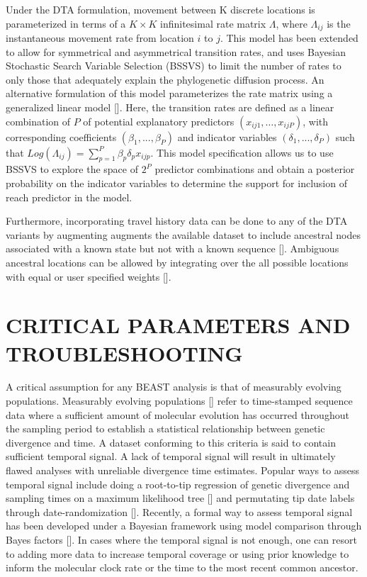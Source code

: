 \documentclass{article}
\begin{document}
\begin{multicols}{2}
Under the DTA formulation, movement between K discrete locations is parameterized in terms of a $K \times K$ infinitesimal rate matrix $\Lambda$, where $\Lambda_{ij}$ is the instantaneous movement rate from location $i$ to $j$. This model has been extended to allow for symmetrical and asymmetrical transition rates, and uses Bayesian Stochastic Search Variable Selection (BSSVS) to limit the number of rates to only those that adequately explain the phylogenetic diffusion process. An alternative formulation of this model parameterizes the rate matrix using a generalized linear model [\cite{glm}]. Here, the transition rates are defined as a linear combination of $P$ of potential explanatory predictors $(x_{ij1}, \dots, x_{ijP})$, with corresponding coefficients $(\beta_1, ..., \beta_P )$ and indicator variables $(\delta_1, ..., \delta_P )$ such that $Log(\Lambda_{ij}) = \sum_{p=1}^P \beta_p \delta_p x_{ijp}$. This model specification allows us to use BSSVS to explore the space of $2^P$ predictor combinations and obtain a posterior probability on the indicator variables to determine the support for inclusion of reach predictor in the model.

Furthermore, incorporating travel history data can be done to any of the DTA variants by augmenting augments the available dataset to include ancestral nodes associated with a known state but not with a known sequence [\cite{travhist}]. Ambiguous ancestral locations can be allowed by integrating over the all possible locations with equal or user specified weights [\cite{ambig}].

\section*{CRITICAL PARAMETERS AND TROUBLESHOOTING}
A critical assumption for any BEAST analysis is that of measurably evolving populations. Measurably evolving populations [\cite{mep1,mep2}] refer to time-stamped sequence data where a sufficient amount of molecular evolution has occurred throughout the sampling period to establish a statistical relationship between genetic divergence and time. A dataset conforming to this criteria is said to contain sufficient temporal signal. A lack of temporal signal will result in ultimately flawed analyses with unreliable divergence time estimates. Popular ways to assess temporal signal include doing a root-to-tip regression of genetic divergence and sampling times on a maximum likelihood tree [\cite{tempest}] and permutating tip date labels through date-randomization [\cite{tipdate}]. Recently, a formal way to assess temporal signal has been developed under a Bayesian framework using model comparison through Bayes factors [\cite{bets}]. In cases where the temporal signal is not enough, one can resort to adding more data to increase temporal coverage or using prior knowledge to inform the molecular clock rate or the time to the most recent common ancestor.


\end{multicols}
\end{document}
